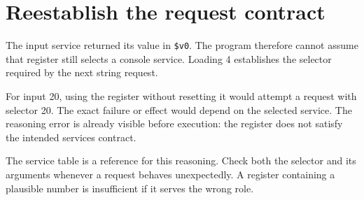 \section{Reestablish the request
  contract}\label{001-console-calculation-p12-reestablish-the-request-contract}

The input service returned its value in \texttt{\$v0}. The program
therefore cannot assume that register still selects a console service.
Loading 4 establishes the selector required by the next string request.

For input 20, using the register without resetting it would attempt a
request with selector 20. The exact failure or effect would depend on
the selected service. The reasoning error is already visible before
execution: the register does not satisfy the intended
service\textquotesingle s contract.

The service table is a reference for this reasoning. Check both the
selector and its arguments whenever a request behaves unexpectedly. A
register containing a plausible number is insufficient if it serves the
wrong role.
